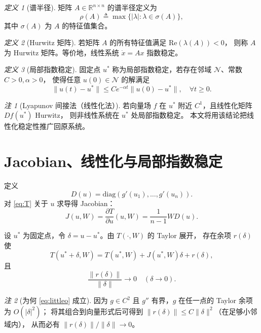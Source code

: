 \documentclass[11pt]{article}
\theoremstyle{plain}
\theoremstyle{remark}
\newtheorem{remark}{注}
\newtheorem{definition}{定义}
\begin{document}
\begin{definition}[谱半径]
矩阵 $A\in\mathbb R^{n\times n}$ 的谱半径定义为
\[
\rho(A)\triangleq \max\{|\lambda|:\lambda\in\sigma(A)\},
\]
其中 $\sigma(A)$ 为 $A$ 的特征值集合。
\end{definition}

\begin{definition}[Hurwitz 矩阵]
若矩阵 $A$ 的所有特征值满足 $\mathrm{Re}(\lambda(A))<0$，
则称 $A$ 为 Hurwitz 矩阵。等价地，线性系统 $\dot x = Ax$ 指数稳定。
\end{definition}

\begin{definition}[局部指数稳定]
固定点 $u^*$ 称为局部指数稳定，若存在邻域 $\mathcal N$、常数 $C>0,\alpha>0$，
使得任意 $u(0)\in\mathcal N$ 的解满足
\[
\|u(t)-u^*\|\le C e^{-\alpha t}\|u(0)-u^*\|,\quad \forall t\ge 0.
\]
\end{definition}

\begin{remark}[Lyapunov 间接法（线性化法）]
若向量场 $f$ 在 $u^*$ 附近 $C^1$，且线性化矩阵 $Df(u^*)$ Hurwitz，
则非线性系统在 $u^*$ 处局部指数稳定。
本文将用该结论把线性化稳定性推广回原系统。
\end{remark}

\section{Jacobian、线性化与局部指数稳定}

定义
\[
D(u)=\mathrm{diag}(g'(u_1),\dots,g'(u_n)).
\]
对 \eqref{eq:T} 关于 $u$ 求导得 Jacobian：
\begin{equation}\label{eq:J}
J(u,W)=\frac{\partial T}{\partial u}(u,W)
=\frac{1}{n-1}W D(u).
\end{equation}

设 $u^*$ 为固定点，令 $\delta=u-u^*$。由 $T(\cdot,W)$ 的 Taylor 展开，
存在余项 $r(\delta)$ 使
\begin{equation}\label{eq:taylor}
T(u^*+\delta,W)
= T(u^*,W)+J(u^*,W)\delta + r(\delta),
\end{equation}
且
\begin{equation}\label{eq:littleo}
\frac{\|r(\delta)\|}{\|\delta\|}\to 0 \quad (\delta\to 0).
\end{equation}

\begin{remark}[为何 \eqref{eq:littleo} 成立]
因为 $g\in C^2$ 且 $g''$ 有界，$g$ 在任一点的 Taylor 余项为 $O(|\delta|^2)$；
将其组合到向量形式后可得到 $\|r(\delta)\|\le C\|\delta\|^2$（在足够小邻域内），
从而必有 $\|r(\delta)\|/\|\delta\|\to 0$。
\end{remark}
\end{document}
